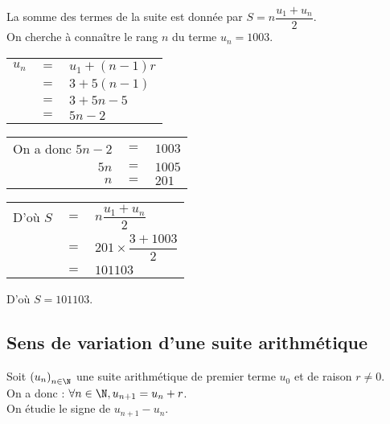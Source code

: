 La somme des termes de la suite est donnée par $S = n\dfrac{u_1+u_n}{2}$. \\

On cherche à connaître le rang $n$ du terme $u_n = 1003$. \\


\begin{tabular}{lll}
$u_n$ & $=$ & $ u_1 + \left(n-1\right)r$ \\
& $=$ & $3 + 5\left(n-1\right)$ \\
& $=$ & $3 + 5n - 5$ \\
& $=$ & $5n - 2$ \\
\end{tabular}

\vspace*{.3cm}

\begin{tabular}{rll}
On a donc $5n - 2$ & $=$ & $1003$ \\
$5n$ & $=$ &$1005$ \\
$n$ & $=$ & $201$ \\ 
\end{tabular}

\vspace*{.3cm}

\begin{tabular}{lll}
D'où $S$ & $=$ & $n\dfrac{u_1+u_n}{2}$ \vspace*{.3cm} \\
& $=$ & $201 \times \dfrac{3 + 1003}{2}$ \vspace*{.3cm} \\
& $=$ & $101 103$ \\
\end{tabular}

\vspace*{.3cm}

D'où $S = 101 103$.

\subsection{Sens de variation d'une suite arithmétique}

Soit $\left(u_n\right)_{n \in \N}$ une suite arithmétique de premier terme $u_0$ et de raison $r \neq 0$. \\

On a donc : $\forall n \in \N, u_{n+1} = u_n + r$. \\

On étudie le signe de $u_{n+1} - u_{n}$. \\

